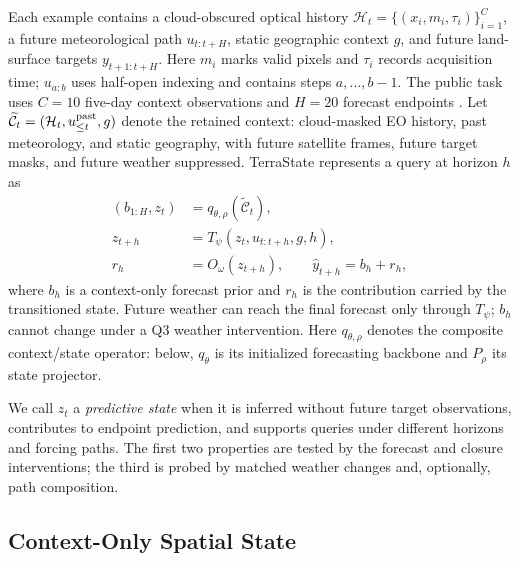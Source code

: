 \documentclass[letterpaper]{article} %
\begin{document}
Each example contains a cloud-obscured optical history
$\mathcal H_t=\{(x_i,m_i,\tau_i)\}_{i=1}^{C}$, a future meteorological path
$u_{t:t+H}$, static geographic context $g$, and future land-surface targets
$y_{t+1:t+H}$. Here $m_i$ marks valid pixels and $\tau_i$ records acquisition
time; $u_{a:b}$ uses half-open indexing and contains steps $a,\ldots,b-1$.
The public task uses $C=10$ five-day context observations and $H=20$
forecast endpoints \cite{benson2024multimodal}. Let
$\widetilde{\mathcal C}_t=(\mathcal H_t,u_{\leq t}^{\rm past},g)$ denote the
retained context: cloud-masked EO history, past meteorology, and static
geography, with future satellite frames, future target masks, and future
weather suppressed. TerraState represents a query at horizon $h$ as
\begin{equation}
\begin{aligned}
(b_{1:H},z_t)&=q_{\theta,\rho}(\widetilde{\mathcal C}_t),\\
z_{t+h}&=T_\psi(z_t,u_{t:t+h},g,h),\\
r_h&=O_\omega(z_{t+h}),\qquad
\widehat y_{t+h}=b_h+r_h ,
\end{aligned}
\label{eq:contract}
\end{equation}
where $b_h$ is a context-only forecast prior and $r_h$ is the contribution
carried by the transitioned state. Future weather can reach the final forecast
only through $T_\psi$; $b_h$ cannot change under a Q3 weather intervention.
Here $q_{\theta,\rho}$ denotes the composite context/state operator: below,
$q_\theta$ is its initialized forecasting backbone and $P_\rho$ its state
projector.

We call $z_t$ a \emph{predictive state} when it is inferred without future
target observations, contributes to endpoint prediction, and supports queries
under different horizons and forcing paths. The first two properties are
tested by the forecast and closure interventions; the third is probed by
matched weather changes and, optionally, path composition.

\subsection{Context-Only Spatial State}
\end{document}
